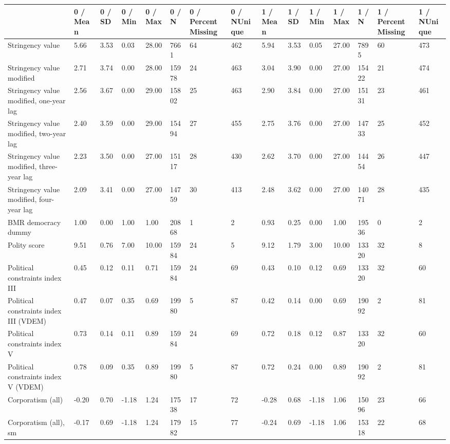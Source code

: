 
\begin{longtable}{lllllllllllllll}
\toprule
  & 0 / Mean & 0 / SD & 0 / Min & 0 / Max & 0 / N & 0 / PercentMissing & 0 / NUnique & 1 / Mean & 1 / SD & 1 / Min & 1 / Max & 1 / N & 1 / PercentMissing & 1 / NUnique\\
\midrule
Stringency value & 5.66 & 3.53 & 0.03 & 28.00 & 7661 & 64 & 462 & 5.94 & 3.53 & 0.05 & 27.00 & 7895 & 60 & 473\\
Stringency value modified & 2.71 & 3.74 & 0.00 & 28.00 & 15978 & 24 & 463 & 3.04 & 3.90 & 0.00 & 27.00 & 15422 & 21 & 474\\
Stringency value modified, one-year lag & 2.56 & 3.67 & 0.00 & 29.00 & 15802 & 25 & 463 & 2.90 & 3.84 & 0.00 & 27.00 & 15131 & 23 & 461\\
Stringency value modified, two-year lag & 2.40 & 3.59 & 0.00 & 29.00 & 15494 & 27 & 455 & 2.75 & 3.76 & 0.00 & 27.00 & 14733 & 25 & 452\\
Stringency value modified, three-year lag & 2.23 & 3.50 & 0.00 & 27.00 & 15117 & 28 & 430 & 2.62 & 3.70 & 0.00 & 27.00 & 14454 & 26 & 447\\
\addlinespace
Stringency value modified, four-year lag & 2.09 & 3.41 & 0.00 & 27.00 & 14759 & 30 & 413 & 2.48 & 3.62 & 0.00 & 27.00 & 14071 & 28 & 435\\
BMR democracy dummy & 1.00 & 0.00 & 1.00 & 1.00 & 20868 & 1 & 2 & 0.93 & 0.25 & 0.00 & 1.00 & 19536 & 0 & 2\\
Polity score & 9.51 & 0.76 & 7.00 & 10.00 & 15984 & 24 & 5 & 9.12 & 1.79 & 3.00 & 10.00 & 13320 & 32 & 8\\
Political constraints index III & 0.45 & 0.12 & 0.11 & 0.71 & 15984 & 24 & 69 & 0.43 & 0.10 & 0.12 & 0.69 & 13320 & 32 & 60\\
Political constraints index III (VDEM) & 0.47 & 0.07 & 0.35 & 0.69 & 19980 & 5 & 87 & 0.42 & 0.14 & 0.00 & 0.69 & 19092 & 2 & 81\\
\addlinespace
Political constraints index V & 0.73 & 0.14 & 0.11 & 0.89 & 15984 & 24 & 69 & 0.72 & 0.18 & 0.12 & 0.87 & 13320 & 32 & 60\\
Political constraints index V (VDEM) & 0.78 & 0.09 & 0.35 & 0.89 & 19980 & 5 & 87 & 0.72 & 0.24 & 0.00 & 0.89 & 19092 & 2 & 81\\
Corporatism (all) & -0.20 & 0.70 & -1.18 & 1.24 & 17538 & 17 & 72 & -0.28 & 0.68 & -1.18 & 1.06 & 15096 & 23 & 66\\
Corporatism (all), sm & -0.17 & 0.69 & -1.18 & 1.24 & 17982 & 15 & 77 & -0.24 & 0.69 & -1.18 & 1.06 & 15318 & 22 & 68\\

\end{longtable}
